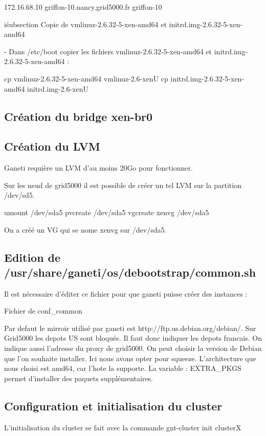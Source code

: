 172.16.68.10    griffon-10.nancy.grid5000.fr griffon-10

iśubsection {Copie de vmlinuz-2.6.32-5-xen-amd64 et initrd.img-2.6.32-5-xen-amd64}

- Dans /etc/boot copier les fichiers vmlinuz-2.6.32-5-xen-amd64 et initrd.img-2.6.32-5-xen-amd64 :

cp vmlinuz-2.6.32-5-xen-amd64 vmlinuz-2.6-xenU
cp initrd.img-2.6.32-5-xen-amd64 initrd.img-2.6-xenU

\subsection {Création du bridge xen-br0}

\subsection {Création du LVM}

Ganeti requière un LVM d'au moins 20Go pour fonctionner.

Sur les neud de grid5000 il est possible de créer un tel LVM sur la partition /dev/sd5.

umount /dev/sda5
pvcreate /dev/sda5
vgcreate xenvg /dev/sda5

On a créé un VG qui se nome xenvg sur /dev/sda5.

\subsection {Edition de /usr/share/ganeti/os/debootstrap/common.sh}

Il est nécessaire d'éditer ce fichier pour que ganeti puisse créer des instances :

{Fichier de conf_common}

Par defaut le mirroir utilisé par ganeti est http://ftp.us.debian.org/debian/. Sur Grid5000 les depots US sont bloqués. Il faut donc indiquer les depots francais.
On indique aussi l'adresse du  proxy de grid5000.
On peut choisir la version de Debian que l'on souhaite installer. Ici nous avons opter pour squeeze.
L'architecture que nous choisi est amd64, car l'hote la supporte.
La variable : EXTRA_PKGS permet d'installer des paquets supplémentaires.

\subsection {Configuration et initialisation du cluster}
L'initialisation du cluster se fait avec la commande gnt-cluster init clusterX

